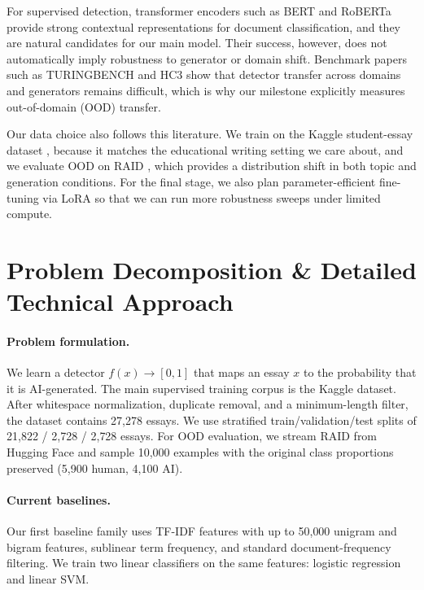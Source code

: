 \documentclass{article}
\begin{document}
For supervised detection, transformer encoders such as BERT \citep{devlin2019bert} and RoBERTa \citep{liu2019roberta} provide strong contextual representations for document classification, and they are natural candidates for our main model. Their success, however, does not automatically imply robustness to generator or domain shift. Benchmark papers such as TURINGBENCH \citep{uchendu2021turingbench} and HC3 \citep{guo2023hc3} show that detector transfer across domains and generators remains difficult, which is why our milestone explicitly measures out-of-domain (OOD) transfer.

Our data choice also follows this literature. We train on the Kaggle student-essay dataset \citep{thite2026kaggle}, because it matches the educational writing setting we care about, and we evaluate OOD on RAID \citep{dugan2024raid}, which provides a distribution shift in both topic and generation conditions. For the final stage, we also plan parameter-efficient fine-tuning via LoRA \citep{hu2022lora} so that we can run more robustness sweeps under limited compute.

\section{Problem Decomposition \& Detailed Technical Approach}
\paragraph{Problem formulation.}
We learn a detector $f(x) \rightarrow [0,1]$ that maps an essay $x$ to the probability that it is AI-generated. The main supervised training corpus is the Kaggle dataset. After whitespace normalization, duplicate removal, and a minimum-length filter, the dataset contains 27{,}278 essays. We use stratified train/validation/test splits of 21{,}822 / 2{,}728 / 2{,}728 essays. For OOD evaluation, we stream RAID from Hugging Face and sample 10{,}000 examples with the original class proportions preserved (5{,}900 human, 4{,}100 AI).

\paragraph{Current baselines.}
Our first baseline family uses TF-IDF features with up to 50{,}000 unigram and bigram features, sublinear term frequency, and standard document-frequency filtering. We train two linear classifiers on the same features: logistic regression and linear SVM.
\end{document}
